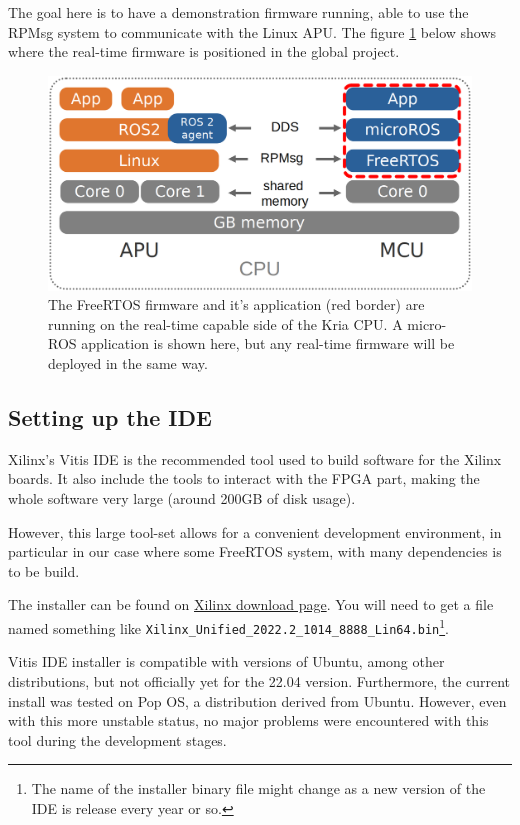 \documentclass[10pt]{article}
\begin{document}
The goal here is to have a demonstration firmware running,
able to use the RPMsg system to communicate with the Linux APU.
The figure \ref{fig:orgbaaf112} below shows where the real-time firmware
is positioned in the global project.

\begin{figure}[htbp]
\centering
\includegraphics[width=.6\textwidth]{./img/map_microros.png}
\caption{\label{fig:orgbaaf112}The FreeRTOS firmware and it's application (red border) are running on the real-time capable side of the Kria CPU. A micro-ROS application is shown here, but any real-time firmware will be deployed in the same way.}
\end{figure}

\subsection{Setting up the IDE}
\label{sec:org4b03ff3}
Xilinx's Vitis IDE is the recommended tool used to build software for the Xilinx boards.
It also include the tools to interact with the FPGA part, making the whole
software very large (around 200GB of disk usage).

However, this large tool-set allows for a convenient development environment, in particular
in our case where some FreeRTOS system, with many dependencies is to be build.

The installer can be found on \href{https://www.xilinx.com/support/download/index.html/content/xilinx/en/downloadNav/vitis.html}{Xilinx download page}. You will need to get
a file named something like \texttt{Xilinx\_Unified\_2022.2\_1014\_8888\_Lin64.bin}\footnote{The name of the installer binary file might change as a new version of the IDE
is release every year or so.}.

Vitis IDE installer is compatible with versions of Ubuntu, among other distributions,
but not officially yet for the 22.04 version.
Furthermore, the current install was tested on Pop OS, a distribution derived from Ubuntu.
However, even with this more unstable status, no major problems were encountered
with this tool during the development stages.
\end{document}
